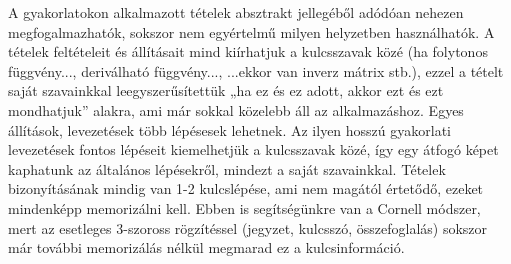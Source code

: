 \documentclass[../Main.tex]{subfiles}
\begin{document}
\begin{flushleft}
A gyakorlatokon alkalmazott tételek absztrakt jellegéből adódóan nehezen
megfogalmazhatók, sokszor nem egyértelmű milyen helyzetben használhatók. A tételek
feltételeit és állításait mind kiírhatjuk a kulcsszavak közé (ha folytonos függvény...,
deriválható függvény..., ...ekkor van inverz mátrix stb.), ezzel a tételt saját szavainkkal
leegyszerűsítettük „ha ez és ez adott, akkor ezt és ezt mondhatjuk” alakra, ami már sokkal
közelebb áll az alkalmazáshoz. Egyes állítások, levezetések több lépésesek lehetnek. Az
ilyen hosszú gyakorlati levezetések fontos lépéseit kiemelhetjük a kulcsszavak közé, így
egy átfogó képet kaphatunk az általános lépésekről, mindezt a saját szavainkkal.
Tételek bizonyításának mindig van 1-2 kulcslépése, ami nem magától értetődő, ezeket
mindenképp memorizálni kell. Ebben is segítségünkre van a Cornell módszer, mert az
esetleges 3-szoross rögzítéssel (jegyzet, kulcsszó, összefoglalás) sokszor már további
memorizálás nélkül megmarad ez a kulcsinformáció.
\end{flushleft}
\end{document}
